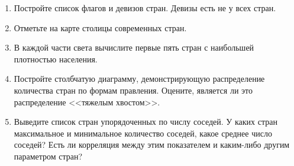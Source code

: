 \begin{enumerate}
	\item Постройте список флагов и девизов стран. Девизы есть не у всех стран.
	\item Отметьте на карте столицы современных стран.
	\item В каждой части света вычислите первые пять стран с наибольшей плотностью населения.
	\item Постройте столбчатую диаграмму, демонстрирующую распределение количества стран по формам правления. Оцените, является ли это распределение <<тяжелым хвостом>>.
	\item Выведите список стран упорядоченных по числу соседей. У каких стран максимальное и минимальное количество соседей, какое среднее число соседей? Есть ли корреляция между этим показателем и каким-либо другим параметром стран?
\end{enumerate}